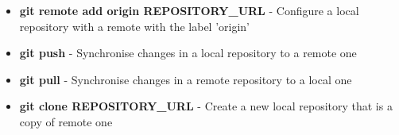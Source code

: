 \documentclass[10pt]{extarticle}
\def\itempad{0pt}
\begin{document}
\begin{navybox}[title=Git Command Cheat Sheet]
  \begin{itemize}
    \itemsep\itempad
  \item \textbf{git remote add origin REPOSITORY\_URL} - Configure a local
    repository with a remote with the label 'origin'
  \item \textbf{git push} - Synchronise changes in a local repository to a
    remote one
  \item \textbf{git pull} - Synchronise changes in a remote repository to a
    local one
  \item \textbf{git clone REPOSITORY\_URL} - Create a new local repository that
    is a copy of remote one
  \end{itemize}
\end{navybox}


\furtherhelp
\end{document}
